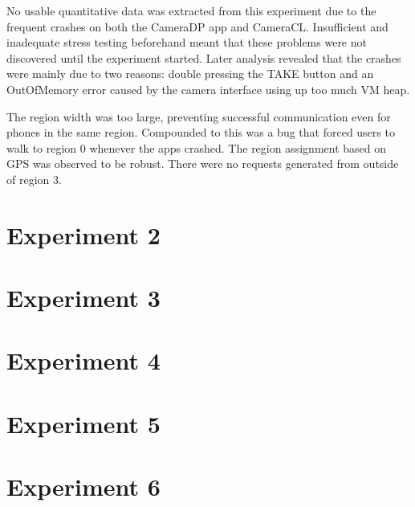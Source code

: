 No usable quantitative data was extracted from this experiment due to the frequent crashes on both the CameraDP app and CameraCL. Insufficient and inadequate stress testing beforehand meant that these problems were not discovered until the experiment started. Later analysis revealed that the crashes were mainly due to two reasons: double pressing the TAKE button and an OutOfMemory error caused by the camera interface using up too much VM heap. 

The region width was too large, preventing successful communication even for phones in the same region. Compounded to this was a bug that forced users to walk to region 0 whenever the apps crashed. The region assignment based on GPS was observed to be robust. There were no requests generated from outside of region 3.

\section{Experiment 2}
\section{Experiment 3}
\section{Experiment 4}
\section{Experiment 5}
\section{Experiment 6}

